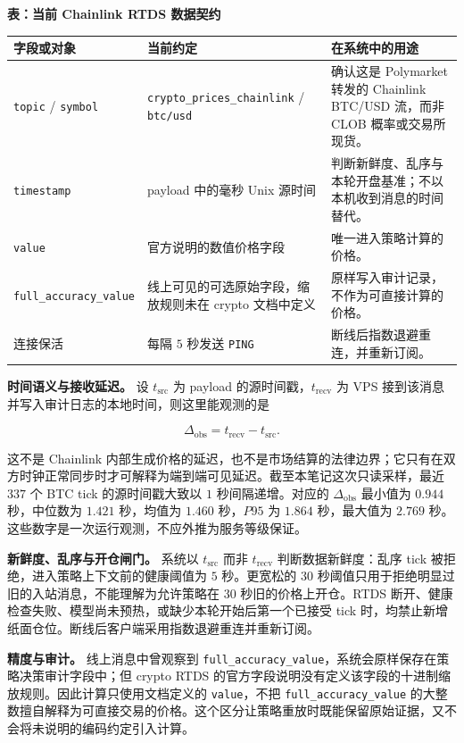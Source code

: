\begin{center}
\small
\textbf{表：当前 Chainlink RTDS 数据契约}\par\medskip
\begin{tabular}{@{}p{}p{}p{}@{}}
\toprule
字段或对象 & 当前约定 & 在系统中的用途 \\
\midrule
\texttt{topic} / \texttt{symbol} & \texttt{crypto\_prices\_chainlink} / \texttt{btc/usd} & 确认这是 Polymarket 转发的 Chainlink BTC/USD 流，而非 CLOB 概率或交易所现货。 \\
\texttt{timestamp} & payload 中的毫秒 Unix 源时间 & 判断新鲜度、乱序与本轮开盘基准；不以本机收到消息的时间替代。 \\
\texttt{value} & 官方说明的数值价格字段 & 唯一进入策略计算的价格。 \\
\texttt{full\_accuracy\_value} & 线上可见的可选原始字段，缩放规则未在 crypto 文档中定义 & 原样写入审计记录，不作为可直接计算的价格。 \\
连接保活 & 每隔 \(5\) 秒发送 \texttt{PING} & 断线后指数退避重连，并重新订阅。 \\
\bottomrule
\end{tabular}
\end{center}

\textbf{时间语义与接收延迟。} 设 \(t_{\mathrm{src}}\) 为 payload 的源时间戳，\(t_{\mathrm{recv}}\) 为 VPS 接到该消息并写入审计日志的本地时间，则这里能观测的是

\[
\Delta_{\mathrm{obs}} = t_{\mathrm{recv}} - t_{\mathrm{src}}.
\]

这不是 Chainlink 内部生成价格的延迟，也不是市场结算的法律边界；它只有在双方时钟正常同步时才可解释为端到端可见延迟。截至本笔记这次只读采样，最近 \(337\) 个 BTC tick 的源时间戳大致以 \(1\) 秒间隔递增。对应的 \(\Delta_{\mathrm{obs}}\) 最小值为 \(0.944\) 秒，中位数为 \(1.421\) 秒，均值为 \(1.460\) 秒，\(P95\) 为 \(1.864\) 秒，最大值为 \(2.769\) 秒。这些数字是一次运行观测，不应外推为服务等级保证。

\textbf{新鲜度、乱序与开仓闸门。} 系统以 \(t_{\mathrm{src}}\) 而非 \(t_{\mathrm{recv}}\) 判断数据新鲜度：乱序 tick 被拒绝，进入策略上下文前的健康阈值为 \(5\) 秒。更宽松的 \(30\) 秒阈值只用于拒绝明显过旧的入站消息，不能理解为允许策略在 \(30\) 秒旧的价格上开仓。RTDS 断开、健康检查失败、模型尚未预热，或缺少本轮开始后第一个已接受 tick 时，均禁止新增纸面仓位。断线后客户端采用指数退避重连并重新订阅。

\textbf{精度与审计。} 线上消息中曾观察到 \texttt{full\_accuracy\_value}，系统会原样保存在策略决策审计字段中；但 crypto RTDS 的官方字段说明没有定义该字段的十进制缩放规则。因此计算只使用文档定义的 \texttt{value}，不把 \texttt{full\_accuracy\_value} 的大整数擅自解释为可直接交易的价格。这个区分让策略重放时既能保留原始证据，又不会将未说明的编码约定引入计算。

